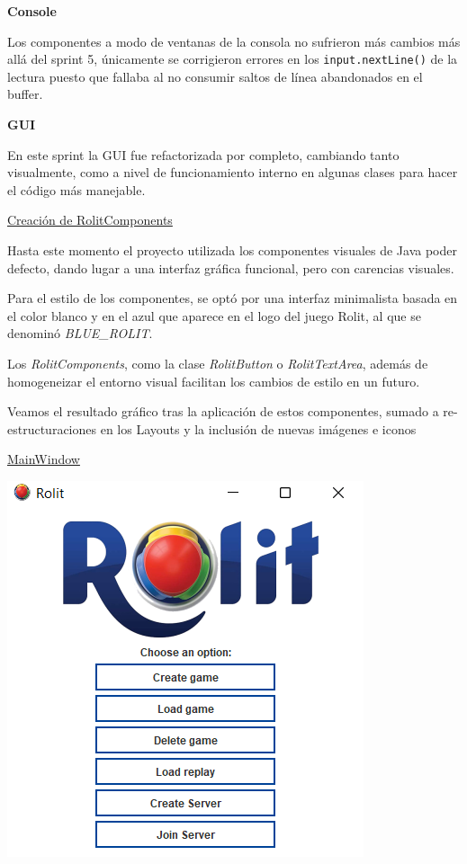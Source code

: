 \documentclass[../DocumentoOficial.tex]{subfiles}
\begin{document}
\begin{sprint}[6]
\textbf{Console}

Los componentes a modo de ventanas de la consola no sufrieron más cambios más allá del sprint 5, únicamente se corrigieron errores en los \texttt{input.nextLine()} de la lectura puesto que fallaba al no consumir saltos de línea abandonados en el buffer.

\textbf{GUI}

En este sprint la GUI fue refactorizada por completo, cambiando tanto visualmente, como a nivel de funcionamiento interno en algunas clases para hacer el código más manejable.

\underline{Creación de RolitComponents}

Hasta este momento el proyecto utilizada los componentes visuales de Java poder defecto, dando lugar a una interfaz gráfica funcional, pero con carencias visuales.

Para el estilo de los componentes, se optó por una interfaz minimalista basada en el color blanco y en el azul que aparece en el logo del juego Rolit, al que se denominó \textit{BLUE\_ROLIT}.

Los \textit{RolitComponents}, como la clase \textit{RolitButton} o \textit{RolitTextArea}, además de homogeneizar el entorno visual facilitan los cambios de estilo en un futuro.

Veamos el resultado gráfico tras la aplicación de estos componentes, sumado a re-estructuraciones en los Layouts y la inclusión de nuevas imágenes e iconos

\underline{MainWindow}
\begin{center}
\includegraphics[scale=1]{menu-sprint-6.png}


\end{center}
\end{sprint}
\end{document}

